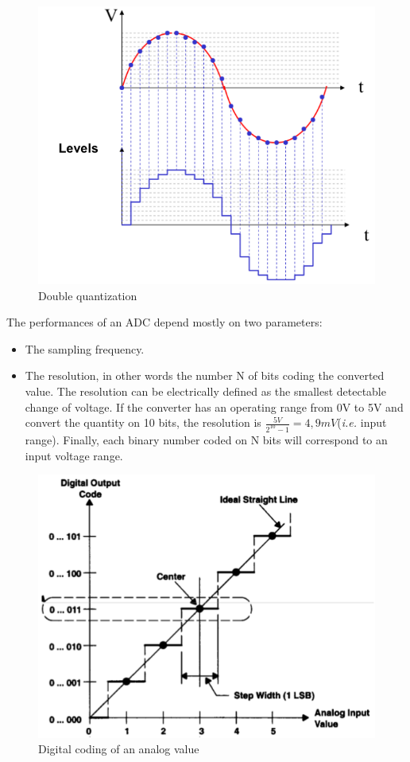 \documentclass[11pt,a4paper]{article}
\theoremstyle{definition}%
\begin{document}
\begin{figure}[H]
	\centering
	\includegraphics[width=.7\textwidth]{ENdouble-quant}
	\caption{Double quantization}
	\label{fig:double-quant}
\end{figure}

The performances of an ADC depend mostly on two parameters:
\begin{itemize}
	\item The sampling frequency.
	\item The resolution, in other words the number N of bits coding the converted value.
    The resolution can be electrically defined as the smallest detectable change of voltage.
    If the converter has an operating range from 0V to 5V and convert the quantity on 10 bits, the resolution is $\frac{5 V}{2^{10}-1} = 4,9 mV$(\textit{i.e.} input range).
    Finally, each binary number coded on N bits will correspond to an input voltage range.

\end{itemize}

\begin{figure}
	\centering
	\includegraphics[width=.7\textwidth]{an-dig}
	\caption{Digital coding of an analog value}
	\label{fig:an-dig}
\end{figure}
\end{document}
